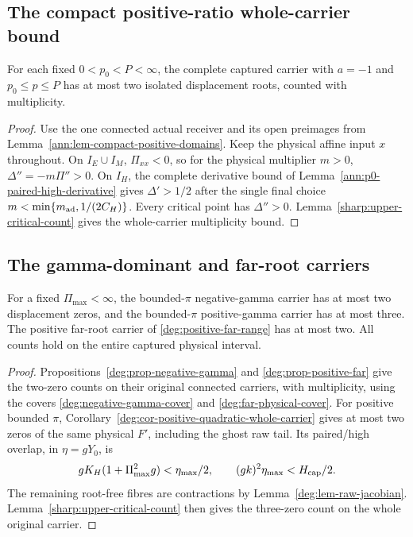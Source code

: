 \subsection{The compact positive-ratio whole-carrier bound}

\begin{proposition}\label{sharp:upper-annulus}
For each fixed \(0<p_0<P<\infty\), the complete captured carrier
with \(a=-1\) and \(p_0\le p\le P\) has at most two
isolated displacement roots, counted with multiplicity.
\end{proposition}
\begin{proof}
Use the one connected actual receiver and its open preimages from
Lemma~\ref{ann:lem-compact-positive-domains}. Keep the physical
affine input \(x\) throughout. On \(I_E\cup I_M\),
\(\Pi_{xx}<0\), so for the physical multiplier \(m>0\),
\(\Delta''=-m\Pi''>0\). On \(I_H\), the complete derivative
bound of Lemma~\ref{ann:p0-paired-high-derivative} gives
\(\Delta'>1/2\) after the single final choice
\(m<\min\{m_{\rm ad},1/(2C_H)\}\).
Every critical point has \(\Delta''>0\).
Lemma~\ref{sharp:upper-critical-count} gives the whole-carrier
multiplicity bound.
\end{proof}
\subsection{The gamma-dominant and far-root carriers}

\begin{proposition}\label{sharp:upper-gamma}
For a fixed \(\Pi_{\max}<\infty\), the bounded-\(\pi\)
negative-gamma carrier has at most two displacement zeros, and the
bounded-\(\pi\) positive-gamma carrier has at most three. The positive
far-root carrier of \eqref{deg:positive-far-range} has at most two.
All counts hold on the entire captured physical interval.
\end{proposition}
\begin{proof}
Propositions~\ref{deg:prop-negative-gamma} and
\ref{deg:prop-positive-far} give the two-zero counts on their
original connected carriers, with multiplicity, using the covers
\eqref{deg:negative-gamma-cover} and \eqref{deg:far-physical-cover}.
For positive bounded \(\pi\),
Corollary~\ref{deg:cor-positive-quadratic-whole-carrier} gives at most
two zeros of the same physical \(F'\), including the ghost raw tail.
Its paired/high overlap, in \(\eta=gY_0\), is
\begin{equation}\label{sharp:upper-gamma-overlap}
 gK_H(1+\Pi_{\max}^2g)<\eta_{\max}/2,\qquad
 (gk)^2\eta_{\max}<H_{\rm cap}/2.
\end{equation}
The remaining root-free fibres are contractions by
Lemma~\ref{deg:lem-raw-jacobian}. Lemma~\ref{sharp:upper-critical-count}
then gives the three-zero count on the whole original carrier.
\end{proof}




